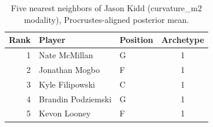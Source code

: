 \begin{table}[htbp]
  \centering\small
  \begin{tabular}{rllc}
    \toprule
    Rank & Player & Position & Archetype \\
    \midrule
    1 & Nate McMillan & G & 1 \\
    2 & Jonathan Mogbo & F & 1 \\
    3 & Kyle Filipowski & C & 1 \\
    4 & Brandin Podziemski & G & 1 \\
    5 & Kevon Looney & F & 1 \\
    \bottomrule
  \end{tabular}
  \caption{Five nearest neighbors of Jason Kidd (curvature_m2 modality), Procrustes-aligned posterior mean.}
  \label{tab:Jason_Kidd_neighbors_curvature_m2}
\end{table}

